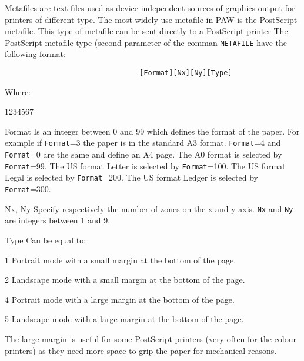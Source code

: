 Metafiles are text files used as device independent sources of graphics output
for printers of different type. The most widely use metafile in PAW is the
PostScript metafile. This type of metafile can be sent directly to a PostScript 
printer The PostScript metafile type (second parameter of the
comman \texttt{METAFILE} have the following format:
\begin{verbatim}
                               -[Format][Nx][Ny][Type]
\end{verbatim}
    Where:
\begin{DLtt}{1234567}
\item[Format] Is an integer between 0 and 99 which defines the format of the
              paper. For example if \texttt{Format}=3 the paper is in the standard
              A3 format. \texttt{Format}=4 and \texttt{Format}=0 are the same and
              define an A4 page. The A0 format is selected by \texttt{Format}=99.
              The US format Letter is selected by \texttt{Format}=100.
              The US format Legal is selected by \texttt{Format}=200.
              The US format Ledger is selected by \texttt{Format}=300.
\item[Nx, Ny] Specify respectively the number of zones on the x and y axis.
              \texttt{Nx} and \texttt{Ny} are integers between 1 and 9.
\item[Type] Can be equal to:
\begin{DLtt}{12}
\item[1] Portrait mode with a small margin at the bottom of the page.
\item[2] Landscape mode with a small margin at the bottom of the page.
\item[4] Portrait mode with a large margin at the bottom of the page.
\item[5] Landscape mode with a large margin at the bottom of the page.

The large margin is useful for some PostScript printers (very often for the 
colour printers)  as they need more space to
grip the paper for mechanical reasons.


\end{DLtt}
\end{DLtt}
